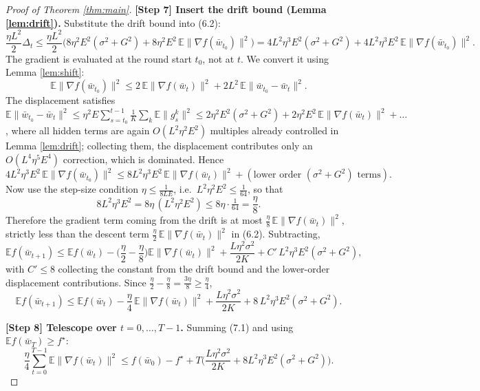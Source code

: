 \documentclass[11pt]{article}
\begin{document}
\begin{proof}[Proof of Theorem \ref{thm:main}]
\textbf{[Step 7] Insert the drift bound (Lemma \ref{lem:drift}).}
Substitute the drift bound into (6.2):
\[
\frac{\eta L^2}{2}\Delta_t
\le \frac{\eta L^2}{2}\Big(8\eta^2E^2(\sigma^2+G^2)
   + 8\eta^2E^2\,\mathbb{E}\|\nabla f(\bar w_{t_0})\|^2\Big)
= 4L^2\eta^3E^2(\sigma^2+G^2) + 4L^2\eta^3E^2\,\mathbb{E}\|\nabla f(\bar w_{t_0})\|^2.
\]
The gradient is evaluated at the round start $t_0$, not at $t$. We convert it
using Lemma \ref{lem:shift}:
\[
\mathbb{E}\|\nabla f(\bar w_{t_0})\|^2
\le 2\,\mathbb{E}\|\nabla f(\bar w_t)\|^2
   + 2L^2\,\mathbb{E}\|\bar w_{t_0}-\bar w_t\|^2 .
\]
The displacement satisfies
$\mathbb{E}\|\bar w_{t_0}-\bar w_t\|^2
\le \eta^2 E\sum_{s=t_0}^{t-1}\frac1K\sum_k\mathbb{E}\|g_s^k\|^2
\le 2\eta^2E^2(\sigma^2+G^2) + 2\eta^2E^2\,\mathbb{E}\|\nabla f(\bar w_t)\|^2 + \dots$,
where all hidden terms are again $O(L^2\eta^2E^2)$ multiples already controlled
in Lemma \ref{lem:drift}; collecting them, the displacement contributes only an
$O(L^4\eta^5E^4)$ correction, which is dominated. Hence
\[
4L^2\eta^3E^2\,\mathbb{E}\|\nabla f(\bar w_{t_0})\|^2
\le 8L^2\eta^3E^2\,\mathbb{E}\|\nabla f(\bar w_t)\|^2
   + (\text{lower order } (\sigma^2+G^2)\text{ terms}).
\]
Now use the step-size condition $\eta\le\frac{1}{8LE}$, i.e.\
$L^2\eta^2E^2\le\frac{1}{64}$, so that
\[
8L^2\eta^3E^2 = 8\eta\,(L^2\eta^2E^2) \le 8\eta\cdot\tfrac{1}{64}
= \frac{\eta}{8}.
\]
Therefore the gradient term coming from the drift is at most
$\tfrac{\eta}{8}\,\mathbb{E}\|\nabla f(\bar w_t)\|^2$, strictly less than the
descent term $\tfrac{\eta}{2}\,\mathbb{E}\|\nabla f(\bar w_t)\|^2$ in (6.2).
Subtracting,
\[
\mathbb{E} f(\bar w_{t+1})
\le \mathbb{E} f(\bar w_t)
 -\Big(\frac{\eta}{2}-\frac{\eta}{8}\Big)\mathbb{E}\|\nabla f(\bar w_t)\|^2
 +\frac{L\eta^2 \sigma^2}{2K}
 + C'\,L^2\eta^3E^2(\sigma^2+G^2),
\]
with $C'\le 8$ collecting the constant from the drift bound and the
lower-order displacement contributions. Since
$\frac{\eta}{2}-\frac{\eta}{8}=\frac{3\eta}{8}\ge\frac{\eta}{4}$,
\[
\mathbb{E} f(\bar w_{t+1})
\le \mathbb{E} f(\bar w_t)
 -\frac{\eta}{4}\,\mathbb{E}\|\nabla f(\bar w_t)\|^2
 +\frac{L\eta^2 \sigma^2}{2K}
 + 8\,L^2\eta^3E^2(\sigma^2+G^2).
\tag{7.1}
\]

\textbf{[Step 8] Telescope over $t = 0,\dots,T-1$.}
Summing (7.1) and using $\mathbb{E} f(\bar w_T)\ge f^\star$:
\[
\frac{\eta}{4}\sum_{t=0}^{T-1}\mathbb{E}\|\nabla f(\bar w_t)\|^2
\le f(\bar w_0) - f^\star
 + T\Big(\frac{L\eta^2\sigma^2}{2K} + 8L^2\eta^3 E^2(\sigma^2+G^2)\Big).
\]


\end{proof}
\end{document}
